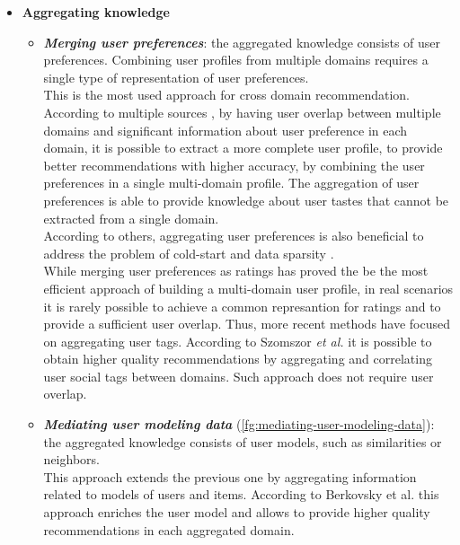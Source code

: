 \begin{itemize}
\item \textbf{Aggregating knowledge}
\begin{itemize}
\item \textbf{\textit{Merging user preferences}}: the aggregated knowledge consists of user preferences. Combining user profiles from multiple domains requires a single type of representation of user preferences.\\
This is the most used approach for cross domain recommendation. According to multiple sources \cite{10.1007/s11257-012-9131-2, 10.1007/978-3-540-88564-1_40, 10.1007/978-3-540-73078-1_44, 10.1145/1297231.1297238, 10.1007/s00354-008-0041-0}, by having user overlap between multiple domains and significant information about user preference in each domain, it is possible to extract a more complete user profile, to provide better recommendations with higher accuracy, by combining the user preferences in a single multi-domain profile. The aggregation of user preferences is able to provide knowledge about user tastes that cannot be extracted from a single domain.\\
According to others, aggregating user preferences is also beneficial to address the problem of cold-start \cite{10.1007/978-3-642-38844-6_25} and data sparsity \cite{10.1007/s11257-012-9128-x}.\\
While merging user preferences as ratings has proved the be the most efficient approach of building a multi-domain user profile, in real scenarios it is rarely possible to achieve a common represantion for ratings and to provide a sufficient user overlap. Thus, more recent methods have focused on aggregating user tags. According to Szomszor \textit{et al.} \cite{10.1145/1379092.1379103, 10.1007/978-3-540-88564-1_40} it is possible to obtain higher quality recommendations by aggregating and correlating user social tags between domains. Such approach does not require user overlap.
\item \textbf{\textit{Mediating user modeling data}} (\autoref{fg:mediating-user-modeling-data}): the aggregated knowledge consists of user models, such as similarities or neighbors.\\
This approach extends the previous one by aggregating information related to models of users and items. According to Berkovsky et al. \cite{10.1007/s11257-007-9042-9, 10.1007/11590323_22} this approach enriches the user model and allows to provide higher quality recommendations in each aggregated domain.\\

\end{itemize}
\end{itemize}
